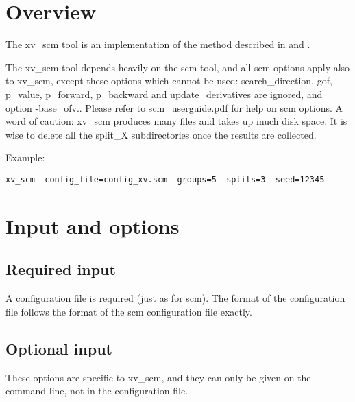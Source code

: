 
\usepackage{hyperref}


\maketitle
\tableofcontents
\newpage

\section{Overview}
The xv\_scm tool is an implementation of the method described in \cite{Katsube1} and \cite{Katsube2}. 

The xv\_scm tool depends heavily on the scm tool, and all scm options apply also to xv\_scm, except these options which cannot be used:
search\_direction, gof, p\_value, p\_forward, p\_backward and update\_derivatives are ignored, and option -base\_ofv.. Please refer to scm\_userguide.pdf for help on scm options.
A word of caution: xv\_scm produces many files and takes up much disk space. It is wise to delete all the split\_X subdirectories once the results are collected.

Example:
\begin{verbatim}
xv_scm -config_file=config_xv.scm -groups=5 -splits=3 -seed=12345
\end{verbatim}

\section{Input and options}

\subsection{Required input}
A configuration file is required (just as for scm).  The format of the configuration file follows the format of the scm configuration file exactly.

\subsection{Optional input}

These options are specific to xv\_scm, and they can only be given on the command line, not in the configuration file.

